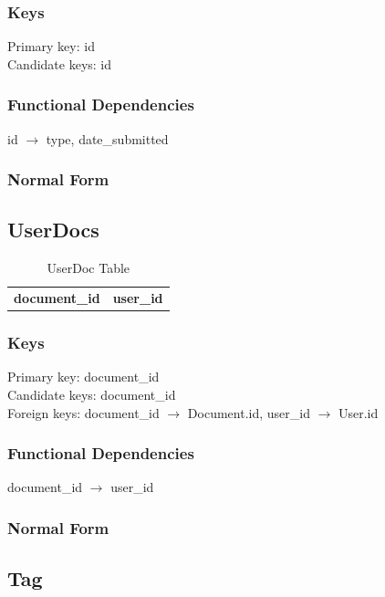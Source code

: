 \documentclass[11pt]{article}
\begin{document}
\subsubsection{Keys}
\label{sec-3-8-1}

    
    Primary key: id\\
    Candidate keys: id
\subsubsection{Functional Dependencies}
\label{sec-3-8-2}


    id $\rightarrow$ type, date\_submitted
\subsubsection{Normal Form}
\label{sec-3-8-3}
\subsection{UserDocs}
\label{sec-3-9}


\begin{table}[htb]
\caption{UserDoc Table} 
\begin{center}
\begin{tabular}{ll}
 \textbf{document\_id}  &  \textbf{user\_id}  \\
\end{tabular}
\end{center}
\end{table}
\subsubsection{Keys}
\label{sec-3-9-1}

    
    Primary key: document\_id\\
    Candidate keys: document\_id\\
    Foreign keys: document\_id $\rightarrow$ Document.id, user\_id $\rightarrow$ User.id
\subsubsection{Functional Dependencies}
\label{sec-3-9-2}


    document\_id $\rightarrow$ user\_id
\subsubsection{Normal Form}
\label{sec-3-9-3}
\subsection{Tag}
\label{sec-3-10}
\end{document}
